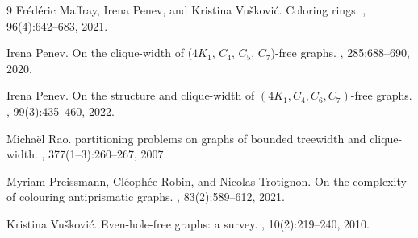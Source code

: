 \documentclass[12pt]{article}
\begin{document}
\begin{thebibliography}{9}
	Fr{\'{e}}d{\'{e}}ric Maffray, Irena Penev, and Kristina Vu{\v s}kovi{\'c}.
	\newblock Coloring rings.
	, 96(4):642--683, 2021.
	
	
	
	Irena Penev.
	\newblock On the clique-width of {($4K_1$, $C_4$, $C_5$, $C_7$)}-free graphs.
	, 285:688--690, 2020.
	
	Irena Penev.
	\newblock On the structure and clique-width of {$(4K_1, C_4, C_6, C_7)$}-free
	graphs.
	, 99(3):435--460, 2022.
	
	Micha{\"{e}}l Rao.
	 partitioning problems on graphs of bounded treewidth and
	clique-width.
	, 377(1--3):260--267, 2007.
	
	Myriam Preissmann, Cl{\'{e}}oph{\'{e}}e Robin, and Nicolas Trotignon.
	\newblock On the complexity of colouring antiprismatic graphs.
	, 83(2):589--612, 2021.
	
	Kristina Vu{\v s}kovi{\'c}.
	\newblock Even-hole-free graphs: a survey.
	, 10(2):219--240,
	2010.
	
	
	
	
	
\end{thebibliography}
\end{document}
